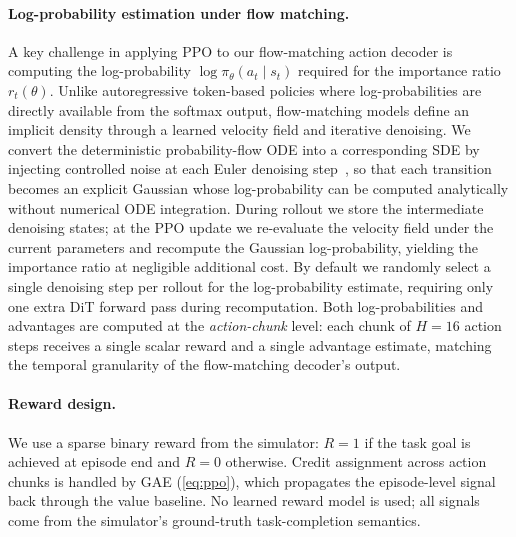 \documentclass{llmxive}
\begin{document}
\paragraph{Log-probability estimation under flow matching.}
A key challenge in applying PPO to our flow-matching action decoder is computing the log-probability $\log\pi_\theta(a_t \mid s_t)$ required for the importance ratio $r_t(\theta)$.
Unlike autoregressive token-based policies where log-probabilities are directly available from the softmax output, flow-matching models define an implicit density through a learned velocity field and iterative denoising.
We convert the deterministic probability-flow ODE into a corresponding SDE by injecting controlled noise at each Euler denoising step~\citep{song2021score}, so that each transition becomes an explicit Gaussian whose log-probability can be computed analytically without numerical ODE integration.
During rollout we store the intermediate denoising states; at the PPO update we re-evaluate the velocity field under the current parameters and recompute the Gaussian log-probability, yielding the importance ratio at negligible additional cost.
By default we randomly select a single denoising step per rollout for the log-probability estimate, requiring only one extra DiT forward pass during recomputation.
Both log-probabilities and advantages are computed at the \emph{action-chunk} level: each chunk of $H{=}16$ action steps receives a single scalar reward and a single advantage estimate, matching the temporal granularity of the flow-matching decoder's output.

\paragraph{Reward design.}
We use a sparse binary reward from the simulator: $R{=}1$ if the task goal is achieved at episode end and $R{=}0$ otherwise.
Credit assignment across action chunks is handled by GAE (\cref{eq:ppo}), which propagates the episode-level signal back through the value baseline.
No learned reward model is used; all signals come from the simulator's ground-truth task-completion semantics.
\end{document}
